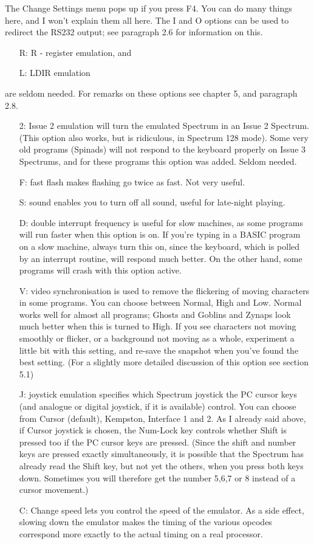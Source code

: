     The Change Settings menu pops up if you press F4.  You can do many
    things here, and I won't explain them all here.  The I and O options can
    be used to redirect the RS232 output; see paragraph 2.6 for information
    on this.
\begin{itemize}
  \item[R:] R - register emulation, and
  \item[L:] LDIR emulation
\end{itemize}
    are seldom needed.  For remarks on these options see chapter 5, and
    paragraph 2.8.
\begin{itemize}
  \item[2:] Issue 2 emulation will turn the emulated Spectrum in an Issue 2
    Spectrum.  (This option also works, but is ridiculous, in Spectrum 128
    mode).  Some very old programs (Spinads) will not respond to the
    keyboard properly on Issue 3 Spectrums, and for these programs this
    option was added.  Seldom needed.
  \item[F:] fast flash makes flashing go twice as fast.  Not very useful.
  \item[S:] sound enables you to turn off all sound, useful for late-night
    playing.
  \item[D:] double interrupt frequency is useful for slow machines, as some
    programs will run faster when this option is on.  If you're typing in a
    BASIC program on a slow machine, always turn this on, since the
    keyboard, which is polled by an interrupt routine, will respond much
    better.  On the other hand, some programs will crash with this option
    active.
  \item[V:] video synchronisation is used to remove the flickering of moving
    characters in some programs.  You can choose between Normal, High and
    Low.  Normal works well for almost all programs; Ghosts and Goblins and
    Zynaps look much better when this is turned to High.  If you see
    characters not moving smoothly or flicker, or a background not moving as
    a whole, experiment a little bit with this setting, and re-save the
    snapshot when you've found the best setting.  (For a slightly more
    detailed discussion of this option see section 5.1)
  \item[J:] joystick emulation specifies which Spectrum joystick the PC cursor
    keys (and analogue or digital joystick, if it is available) control. You
    can choose from Cursor (default), Kempston, Interface 1 and 2.  As I
    already said above, if Cursor joystick is chosen, the Num-Lock key
    controls whether Shift is pressed too if the PC cursor keys are pressed.
    (Since the shift and number keys are pressed exactly simultaneously, it
    is possible that the Spectrum has already read the Shift key, but not
    yet the others, when you press both keys down. Sometimes you will
    therefore get the number 5,6,7 or 8 instead of a cursor movement.)
  \item[C:] Change speed lets you control the speed of the emulator. As
    a side effect, slowing down the emulator makes the timing of the various
    opcodes correspond more exactly to the actual timing on a real
    processor.
\end{itemize}

